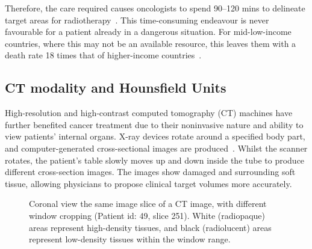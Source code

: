 \documentclass[11pt,twoside]{report}
\begin{document}

Therefore, the care required causes oncologists to spend 90--120 mins to delineate target areas for radiotherapy~\cite{LIU2020184}. This time-consuming endeavour is never favourable for a patient already in a dangerous situation. For mid-low-income countries, where this may not be an available resource, this leaves them with a death rate 18 times that of higher-income countries~\cite{cervical-cancer-epidemic}. 

\subsection{CT modality and Hounsfield Units}\label{sect:ct-modality}

High-resolution and high-contrast computed tomography (CT) machines have further benefited cancer treatment due to their noninvasive nature and ability to view patients' internal organs. X-ray devices rotate around a specified body part, and computer-generated cross-sectional images are produced~\cite{file-formats}. Whilst the scanner rotates, the patient's table slowly moves up and down inside the tube to produce different cross-section images. The images show damaged and surrounding soft tissue, allowing physicians to propose clinical target volumes more accurately.

\begin{figure}[H]
    \centering
    \caption{Coronal view the same image slice of a CT image, with different window cropping (Patient id: 49, slice 251). White (radiopaque) areas represent high-density tissues, and black (radiolucent) areas represent low-density tissues within the window range.}\label{fig:ct-windows}
\end{figure}
\end{document}
